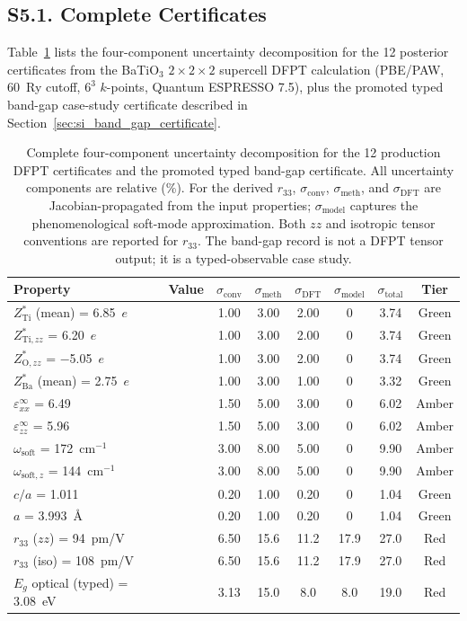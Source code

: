 ﻿\documentclass[prb,onecolumn,superscriptaddress,amsmath,amssymb,longbibliography]{revtex4-2}
\newcommand{\conv}{\mathrm{conv}}
\newcommand{\meth}{\mathrm{meth}}
\begin{document}
\subsection{S5.1. Complete Certificates}

Table~\ref{tab:si_certificates} lists the four-component uncertainty
decomposition for the 12 posterior certificates from the BaTiO$_3$
$2\times2\times2$ supercell DFPT calculation (PBE/PAW, 60~Ry cutoff,
$6^3$ $k$-points, Quantum ESPRESSO 7.5), plus the promoted typed band-gap
case-study certificate described in Section~\ref{sec:si_band_gap_certificate}.

\begin{table}[ht]
\centering
\footnotesize
\caption{Complete four-component uncertainty decomposition for the 12
production DFPT certificates and the promoted typed band-gap certificate. All
uncertainty components are relative (\%).
For the derived $r_{33}$, $\sigma_\conv$, $\sigma_\meth$, and
$\sigma_{\mathrm{DFT}}$ are Jacobian-propagated from the input
properties; $\sigma_{\mathrm{model}}$ captures the phenomenological
soft-mode approximation. Both $zz$ and isotropic tensor conventions
are reported for $r_{33}$. The band-gap record is not a DFPT tensor output; it
is a typed-observable case study.}
\label{tab:si_certificates}
\begin{tabular}{lccccccc}
\toprule
Property & Value & $\sigma_\conv$ & $\sigma_\meth$ &
$\sigma_{\mathrm{DFT}}$ & $\sigma_{\mathrm{model}}$ &
$\sigma_{\mathrm{total}}$ & Tier \\
\midrule
$Z^*_{\mathrm{Ti}}$ (mean) = 6.85~$e$ & & 1.00 & 3.00 & 2.00 & 0 & 3.74 & Green \\
$Z^*_{\mathrm{Ti},zz}$ = 6.20~$e$ & & 1.00 & 3.00 & 2.00 & 0 & 3.74 & Green \\
$Z^*_{\mathrm{O},zz}$ = $-$5.05~$e$ & & 1.00 & 3.00 & 2.00 & 0 & 3.74 & Green \\
$Z^*_{\mathrm{Ba}}$ (mean) = 2.75~$e$ & & 1.00 & 3.00 & 1.00 & 0 & 3.32 & Green \\
$\varepsilon^\infty_{xx}$ = 6.49 & & 1.50 & 5.00 & 3.00 & 0 & 6.02 & Amber \\
$\varepsilon^\infty_{zz}$ = 5.96 & & 1.50 & 5.00 & 3.00 & 0 & 6.02 & Amber \\
$\omega_{\mathrm{soft}}$ = 172~cm$^{-1}$ & & 3.00 & 8.00 & 5.00 & 0 & 9.90 & Amber \\
$\omega_{\mathrm{soft},z}$ = 144~cm$^{-1}$ & & 3.00 & 8.00 & 5.00 & 0 & 9.90 & Amber \\
$c/a$ = 1.011 & & 0.20 & 1.00 & 0.20 & 0 & 1.04 & Green \\
$a$ = 3.993~\AA & & 0.20 & 1.00 & 0.20 & 0 & 1.04 & Green \\
\midrule
$r_{33}$ ($zz$) = 94~pm/V & & 6.50 & 15.6 & 11.2 & 17.9 & 27.0 & Red \\
$r_{33}$ (iso) = 108~pm/V & & 6.50 & 15.6 & 11.2 & 17.9 & 27.0 & Red \\
\midrule
$E_g$ optical (typed) = 3.08~eV & & 3.13 & 15.0 & 8.0 & 8.0 & 19.0 & Red \\
\bottomrule
\end{tabular}
\end{table}
\end{document}

